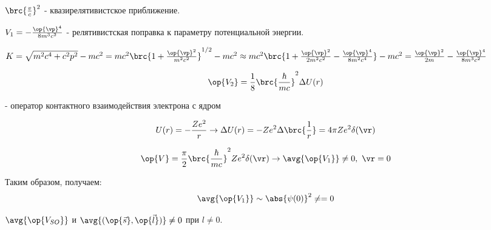$\brc{\frac{v}{c}}^2$ - квазирелятивистское приближение.

$V_1 = -\frac{\op{\vp}^4}{8m^3c^2}$ - релятивистская поправка к параметру потенциальной энергии.

$
K = \sqrt{m^2c^4 + c^2p^2} - mc^2 = mc^2\brc{1 + \frac{\op{\vp}^2}{m^2c^2}}^{1/2} - mc^2 \approx mc^2\brc{1 + \frac{\op{\vp}^2}{2m^2c^2} - \frac{\op{\vp}^4}{8m^2c^4}} - mc^2 = \frac{\op{\vp}^2}{2m} - \frac{\op{\vp}^4}{8m^3c^2}
$

$$
\op{V_2} = \frac{1}{8} \brc{\frac{\hbar}{mc}}^2\Delta U(r) 
$$

- оператор контактного взаимодействия электрона с ядром

$$
U(r)  = -\frac{Ze^2}{r} \to \Delta U(r) = -Ze^2 \Delta \brc{\frac{1}{r}} = 4 \pi Ze^2 \delta(\vr)
$$

$$
\op{V} = \frac{\pi}{2} \brc{\frac{\hbar}{mc}}^2 Ze^2 \delta(\vr) \to \avg{\op{V_1}} \not = 0, ~\vr = 0
$$

Таким образом, получаем:
$$
\avg{\op{V_1}} \sim \abs{\psi(0)}^2 \neq = 0
$$

$\avg{\op{V_{SO}}}$ и $\avg{(\op{\vec{s}}, \op{\vec{l}})} \neq 0$ при $l \neq 0$.
